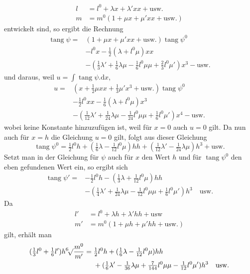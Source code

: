 %
\[
\begin{aligned}
l&=l^0+\lambda x+\lambda'xx+\text{usw.}\\
m&=m^0(1+\mu x+\mu'xx+\text{usw.})
\end{aligned}
\]
entwickelt sind, so ergibt die Rechnung
\[
\begin{aligned}
\operatorname{tang}\psi={}&(1+\mu x+\mu'xx+\text{usw.})\operatorname{tang}\psi^0\\
&-l^0x-\tfrac{1}{2}(\lambda+l^0\mu)xx\\
&-(\tfrac{1}{3}\lambda'+\tfrac{1}{6}\lambda\mu-\tfrac{1}{6}l^0\mu\mu+\tfrac{2}{3}l^0\mu')x^3-\text{usw.}
\end{aligned}
\]
und daraus, weil \(u=\int\operatorname{tang}\psi\mathord{.}\mathrm{d}x\),
\[
\begin{aligned}
u={}&(x+\tfrac{1}{2}\mu xx+\tfrac{1}{3}\mu'x^3+\text{usw.})\operatorname{tang}\psi^0\\
&-\tfrac{1}{2}l^0xx-\tfrac{1}{6}(\lambda+l^0\mu)x^3\\
&-(\tfrac{1}{12}\lambda'+\tfrac{1}{24}\lambda\mu-\tfrac{1}{24}l^0\mu\mu+\tfrac{1}{6}l^0\mu')x^4-\text{usw.}
\end{aligned}
\]
wobei keine Konstante hinzuzufügen ist, weil für \(x=0\) auch \(u=0\) gilt. Da nun auch für \(x=h\) die Gleichung \(u=0\) gilt, folgt aus dieser Gleichung
\[
\operatorname{tang}\psi^0=\tfrac{1}{2}l^0h+(\tfrac{1}{6}\lambda-\tfrac{1}{12}l^0\mu)hh+(\tfrac{1}{12}\lambda'-\tfrac{1}{24}\lambda\mu)h^3+\text{usw.}
\]
Setzt man in der Gleichung für \(\psi\) auch für \(x\) den Wert \(h\) und für \(\operatorname{tang}\psi^0\) den eben gefundenen Wert ein, so ergibt sich
\[
\begin{aligned}
\operatorname{tang}\psi'={}&-\tfrac{1}{2}l^0h-(\tfrac{1}{3}\lambda+\tfrac{1}{12}l^0\mu)hh\\
&-(\tfrac{1}{4}\lambda'+\tfrac{1}{24}\lambda\mu-\tfrac{1}{12}l^0\mu\mu+\tfrac{1}{6}l^0\mu')h^3\quad\text{usw.}
\end{aligned}
\]
Da
\[
\begin{aligned}
l'&=l^0+\lambda h+\lambda'hh+\text{usw}\\
m'&=m^0(1+\mu h+\mu'hh+\text{usw.})
\end{aligned}
\]
gilt, erhält man
\[
\begin{aligned}
(\tfrac{1}{3}l^0+\tfrac{1}{6}l')h\BareRoot[6]{\frac{m^0}{m'}}={}&\tfrac{1}{2}l^0h+(\tfrac{1}{6}\lambda-\tfrac{1}{12}l^0\mu)hh\\
&+(\tfrac{1}{6}\lambda'-\tfrac{1}{36}\lambda\mu+\tfrac{7}{144}l^0\mu\mu-\tfrac{1}{12}l^0\mu')h^3\quad\text{usw.}
\end{aligned}
\]
